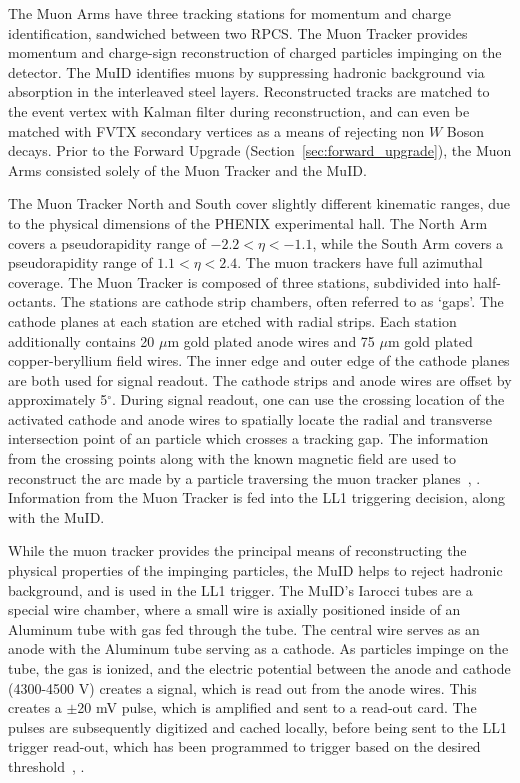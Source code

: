 The Muon Arms have three tracking stations for momentum and charge
identification, sandwiched between two RPCS.  The Muon Tracker provides momentum
and charge-sign reconstruction of charged particles impinging on the detector.
The MuID identifies muons by suppressing hadronic background via absorption in
the interleaved steel layers.  Reconstructed tracks are matched to the event
vertex with Kalman filter during reconstruction, and can even be matched with
FVTX secondary vertices as a means of rejecting non $W$ Boson decays.  Prior to
the Forward Upgrade (Section~\ref{sec:forward_upgrade}), the Muon Arms consisted
solely of the Muon Tracker and the MuID.  

The Muon Tracker North and South cover slightly different kinematic ranges, due
to the physical dimensions of the PHENIX experimental hall. The North Arm covers
a pseudorapidity range of $-2.2 < \eta < -1.1$, while the South Arm covers a
pseudorapidity range of $1.1 < \eta < 2.4$. The muon trackers have full
azimuthal coverage. The Muon Tracker is composed of three stations, subdivided
into half-octants. The stations are cathode strip chambers, often referred to as
`gaps'. The cathode planes at each station are etched with radial strips. Each
station additionally contains 20 $\mu$m gold plated anode wires and 75 $\mu$m
gold plated copper-beryllium field wires. The inner edge and outer edge of the
cathode planes are both used for signal readout. The cathode strips and anode
wires are offset by approximately 5$^\circ$. During signal readout, one can use
the crossing location of the activated cathode and anode wires to spatially
locate the radial and transverse intersection point of an particle which crosses
a tracking gap. The information from the crossing points along with the known
magnetic field are used to reconstruct the arc made by a particle traversing the
muon tracker planes~\cite{Oide2012}, \cite{Hoover2003}. Information from the
Muon Tracker is fed into the LL1 triggering decision, along with the MuID.

While the muon tracker provides the principal means of reconstructing the
physical properties of the impinging particles, the MuID helps to reject
hadronic background, and is used in the LL1 trigger. The MuID's Iarocci tubes
are a special wire chamber, where a small wire is axially positioned inside of
an Aluminum tube with gas fed through the tube. The central wire serves as an
anode with the Aluminum tube serving as a cathode. As particles impinge on the
tube, the gas is ionized, and the electric potential between the anode and
cathode (4300-4500 V) creates a signal, which is read out from the anode wires.
This creates a $\pm$20 mV pulse, which is amplified and sent to a read-out card.
The pulses are subsequently digitized and cached locally, before being sent to
the LL1 trigger read-out, which has been programmed to trigger based on the
desired threshold~\cite{Oide2012}, \cite{Hoover2003}.

